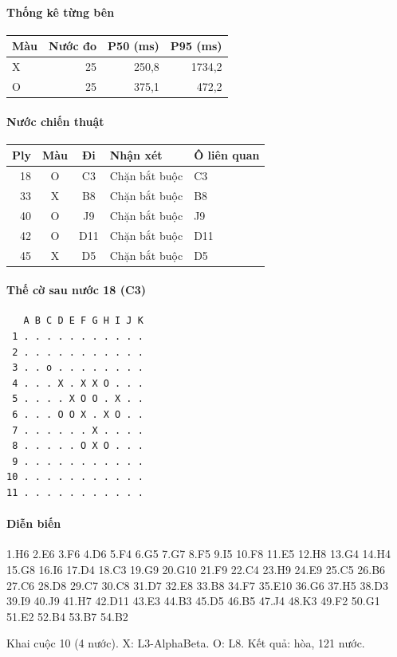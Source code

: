 \paragraph{Thống kê từng bên}
\begin{center}\small
\begin{tabular}{@{}lrrr@{}}
\toprule
Màu & Nước đo & P50 (ms) & P95 (ms) \\
\midrule
X & 25 & 250,8 & 1734,2 \\
O & 25 & 375,1 & 472,2 \\
\bottomrule
\end{tabular}
\end{center}
\paragraph{Nước chiến thuật}
\begin{center}\small
\begin{tabular}{@{}rccll@{}}
\toprule
Ply & Màu & Đi & Nhận xét & Ô liên quan \\
\midrule
18 & O & C3 & Chặn bắt buộc & C3 \\
33 & X & B8 & Chặn bắt buộc & B8 \\
40 & O & J9 & Chặn bắt buộc & J9 \\
42 & O & D11 & Chặn bắt buộc & D11 \\
45 & X & D5 & Chặn bắt buộc & D5 \\
\bottomrule
\end{tabular}
\end{center}
\paragraph{Thế cờ sau nước 18 (C3)}
\begin{verbatim}
   A B C D E F G H I J K
 1 . . . . . . . . . . .
 2 . . . . . . . . . . .
 3 . . o . . . . . . . .
 4 . . . X . X X O . . .
 5 . . . . X O O . X . .
 6 . . . O O X . X O . .
 7 . . . . . . X . . . .
 8 . . . . . O X O . . .
 9 . . . . . . . . . . .
10 . . . . . . . . . . .
11 . . . . . . . . . . .
\end{verbatim}
\paragraph{Diễn biến}
{\footnotesize 1.H6 2.E6 3.F6 4.D6 5.F4 6.G5 7.G7 8.F5 9.I5 10.F8 11.E5 12.H8 13.G4 14.H4 15.G8 16.I6 17.D4 18.C3 19.G9 20.G10 21.F9 22.C4 23.H9 24.E9 25.C5 26.B6 27.C6 28.D8 29.C7 30.C8 31.D7 32.E8 33.B8 34.F7 35.E10 36.G6 37.H5 38.D3 39.I9 40.J9 41.H7 42.D11 43.E3 44.B3 45.D5 46.B5 47.J4 48.K3 49.F2 50.G1 51.E2 52.B4 53.B7 54.B2\par}
Khai cuộc 10 (4 nước). X: L3-AlphaBeta. O: L8. Kết quả: hòa, 121 nước.
